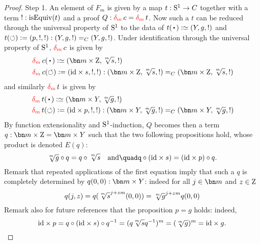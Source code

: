 \begin{proof}
  {\sc Step 1.} An element of $F_m$ is given by a map $t:{\mathrm{S}^1} \to C$
  together with a term $!:\isEq(t)$ and a proof
  $Q: \dg{m}c = \dg{m}t$. Now such a $t$ can be reduced through
  the universal property of ${\mathrm{S}^1}$ to the data of
  $t(\base)\defequi (Y,g,!)$ and
  $t(\circlearrowleft)\mathrel{\vcentcolon=} (p,!,!): (Y,g,!) =_C (Y,g,!)$. Under identification
  through the universal property of ${\mathrm{S}^1}$, $\dg{m}c$ is given by
  \begin{displaymath}
    \begin{split}
      &\dg{m}c(\base) \defequi (\bn m\times \zet,\sqrt[\uproot{2}m] {\etop s},!)\\
      &\dg{m}c(\Sloop) \defis (\id \times {\etop s},!,!): (\bn
      m\times \zet,\sqrt[\uproot{2}m] {\etop s},!) =_C (\bn m\times
      \zet,\sqrt[\uproot{2}m] {\etop s},!)
    \end{split}
  \end{displaymath}
  and similarly $\dg{m}t$ is given by
  \begin{displaymath}
    \begin{split}
      &\dg{m}t(\base) \defequi (\bn m\times Y,\sqrt[\uproot{2}m] g,!)\\
      &\dg{m}t(\Sloop) \defis (\id \times p,!,!): (\bn m\times
      Y,\sqrt[\uproot{2}m] g,!) =_C (\bn m\times Y,\sqrt[\uproot{2}m] g,!)
    \end{split}
  \end{displaymath}
  By function extensionality and ${\mathrm{S}^1}$-induction, $Q$ becomes then a
  term $q:\bn m\times \zet = \bn m\times Y$ such that the two
  following propositions hold, whose product is denoted $E(q)$:
  \begin{displaymath}
    {\sqrt[\uproot{2}m]g} \circ q = q \circ \sqrt[\uproot{2}m]{\etop s}%
    \quad\text{and}\quad%
    q \circ (\id \times {\etop s}) = (\id \times p) \circ q.%
  \end{displaymath}
  Remark that repeated applications of the first equation imply that
  such a $q$ is completely determined by
  $\ptoe q (0,0): \bn m\times Y$: indeed for all $j\in\bn m$ and
  $z\in\mathrm{Z}$
  \begin{displaymath}
    \ptoe q (j,z) = \ptoe q ( \sqrt[\uproot{2}m]s^{j+zm} (0,0))%
    = \sqrt[\uproot{2}m]g^{j+zm} \ptoe q(0,0)%
  \end{displaymath}
  Remark also for future references that the proposition $p=g$ holds:
  indeed,
  \begin{displaymath}
    \id \times p = q \circ (\id \times {\etop s}) \circ q^{-1}
    = (q\sqrt[\uproot{2}m]{\etop s}q^{-1})^m = (\sqrt[\uproot{2}m]g)^m = \id \times g.
  \end{displaymath}
  

\end{proof}
